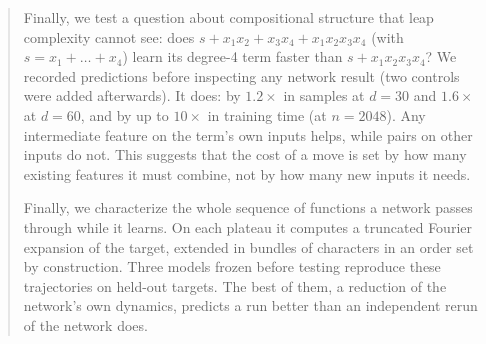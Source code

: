 \begin{abstract}
Finally, we test a question about compositional structure that leap complexity cannot see: does $s+x_1x_2+x_3x_4+x_1x_2x_3x_4$ (with $s=x_1+\dots+x_4$) learn its degree-4 term faster than $s+x_1x_2x_3x_4$? We recorded predictions before inspecting any network result (two controls were added afterwards). It does: by $1.2\times$ in samples at $d=30$ and $1.6\times$ at $d=60$, and by up to $10\times$ in training time (at $n=2048$). Any intermediate feature on the term's own inputs helps, while pairs on other inputs do not. This suggests that the cost of a move is set by how many existing features it must combine, not by how many new inputs it needs.

Finally, we characterize the whole sequence of functions a network passes through while it learns. On each plateau it computes a truncated Fourier expansion of the target, extended in bundles of characters in an order set by construction. Three models frozen before testing reproduce these trajectories on held-out targets. The best of them, a reduction of the network's own dynamics, predicts a run better than an independent rerun of the network does.
\end{abstract}

\tableofcontents
\clearpage













\appendix






